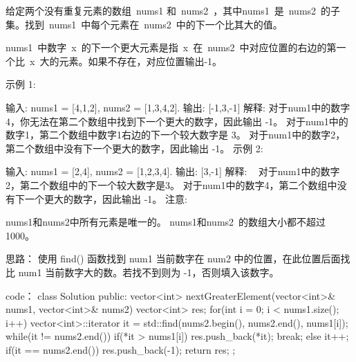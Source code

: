 给定两个没有重复元素的数组 nums1 和 nums2 ，其中nums1 是 nums2 的子集。找到 nums1 中每个元素在 nums2 中的下一个比其大的值。

nums1 中数字 x 的下一个更大元素是指 x 在 nums2 中对应位置的右边的第一个比 x 大的元素。如果不存在，对应位置输出-1。

示例 1:

输入: nums1 = [4,1,2], nums2 = [1,3,4,2].
输出: [-1,3,-1]
解释:
    对于num1中的数字4，你无法在第二个数组中找到下一个更大的数字，因此输出 -1。
    对于num1中的数字1，第二个数组中数字1右边的下一个较大数字是 3。
    对于num1中的数字2，第二个数组中没有下一个更大的数字，因此输出 -1。
示例 2:

输入: nums1 = [2,4], nums2 = [1,2,3,4].
输出: [3,-1]
解释:
    对于num1中的数字2，第二个数组中的下一个较大数字是3。
    对于num1中的数字4，第二个数组中没有下一个更大的数字，因此输出 -1。
注意:

nums1和nums2中所有元素是唯一的。
nums1和nums2 的数组大小都不超过1000。



























思路：
使用 find() 函数找到 num1 当前数字在 num2 中的位置，在此位置后面找比 num1 当前数字大的数。若找不到则为 -1，否则填入该数字。


























code：
class Solution {
public:
    vector<int> nextGreaterElement(vector<int>& nums1, vector<int>& nums2) {
        vector<int> res;
        for(int i = 0; i < nums1.size(); i++)
        {
            vector<int>::iterator it = std::find(nums2.begin(), nums2.end(), nums1[i]);
            while(it != nums2.end())
            {
                if(*it > nums1[i])
                {
                    res.push_back(*it);
                    break;
                }
                else it++;
            }
            if(it == nums2.end()) res.push_back(-1);
        }
        return res;
    }
};